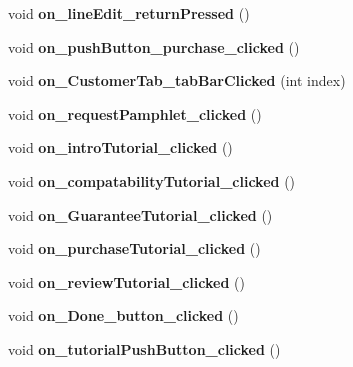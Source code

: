 \begin{DoxyCompactItemize}
\mbox{\label{class_main_window_a6ed67aa63c63c4867166cb21115d64f7}} 
void {\bfseries on\+\_\+line\+Edit\+\_\+return\+Pressed} ()
\item 
\mbox{\label{class_main_window_a105c7ea368b696cb2e166d15f1790394}} 
void {\bfseries on\+\_\+push\+Button\+\_\+purchase\+\_\+clicked} ()
\item 
\mbox{\label{class_main_window_a78a121500bf13fe727e3e8e4375c509b}} 
void {\bfseries on\+\_\+\+Customer\+Tab\+\_\+tab\+Bar\+Clicked} (int index)
\item 
\mbox{\label{class_main_window_af4523ace880c4d263f06c7da8b9bc8f6}} 
void {\bfseries on\+\_\+request\+Pamphlet\+\_\+clicked} ()
\item 
\mbox{\label{class_main_window_aaf91fab35a1a2e8e6be908bedf8c0af5}} 
void {\bfseries on\+\_\+intro\+Tutorial\+\_\+clicked} ()
\item 
\mbox{\label{class_main_window_a7ecb35634cefcdbf14f83fdcc1ebf525}} 
void {\bfseries on\+\_\+compatability\+Tutorial\+\_\+clicked} ()
\item 
\mbox{\label{class_main_window_a24081cae9660b5eb8cddaedeafbc66dd}} 
void {\bfseries on\+\_\+\+Guarantee\+Tutorial\+\_\+clicked} ()
\item 
\mbox{\label{class_main_window_af11eef334b3ac8358d1eb8be6cffa60b}} 
void {\bfseries on\+\_\+purchase\+Tutorial\+\_\+clicked} ()
\item 
\mbox{\label{class_main_window_aed80016bf2bdaad4dff0205a12f07f10}} 
void {\bfseries on\+\_\+review\+Tutorial\+\_\+clicked} ()
\item 
\mbox{\label{class_main_window_a96fcd161f1670792c903c9d4a994e279}} 
void {\bfseries on\+\_\+\+Done\+\_\+button\+\_\+clicked} ()
\item 
\mbox{\label{class_main_window_a63c4685cc0e0ade70ea78c7a584dd637}} 
void {\bfseries on\+\_\+tutorial\+Push\+Button\+\_\+clicked} ()

\end{DoxyCompactItemize}
